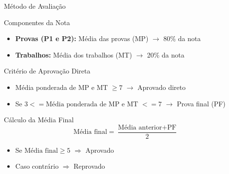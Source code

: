 \begin{frame}{Método de Avaliação}
  \begin{block}{Componentes da Nota}
    \begin{itemize}
      \item \textbf{Provas (P1 e P2):}
            Média das provas (MP) $\rightarrow$ 80\% da nota
      \item \textbf{Trabalhos:}
            Média dos trabalhos (MT) $\rightarrow$ 20\% da nota
    \end{itemize}
  \end{block}

  \begin{block}{Critério de Aprovação Direta}
    \begin{itemize}
      \item Média ponderada de MP e MT $\geq 7$
            \hspace{1em} $\rightarrow$ Aprovado direto
      \item Se $3 <= \text{Média ponderada de MP e MT } <= 7$
            \hspace{1em} $\rightarrow$ Prova final (PF)
    \end{itemize}
  \end{block}

  \begin{block}{Cálculo da Média Final}
    \[
      \text{Média final} = \frac{\text{Média anterior} + \text{PF}}{2}
    \]
    \begin{itemize}
      \item Se $\text{Média final} \geq 5$ $\Rightarrow$ Aprovado
      \item Caso contrário $\Rightarrow$ Reprovado
    \end{itemize}
  \end{block}
\end{frame}

